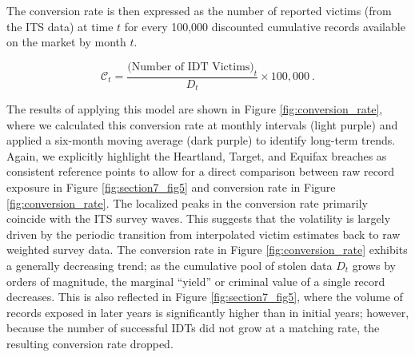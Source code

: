 The conversion rate is then expressed as the number of reported victims (from the ITS data) at time $t$ for every 100,000 discounted cumulative records available on the market by month $t$. 

\begin{equation}\mathcal{C}_t = \frac{\text{(Number of IDT Victims)}_t}{D_t} \times 100,000~. 
\end{equation}

The results of applying this model are shown in Figure \ref{fig:conversion_rate}, where we calculated this conversion rate at monthly intervals (light purple) and applied a six-month moving average (dark purple) to identify long-term trends. Again, we explicitly highlight the Heartland, Target, and Equifax breaches as consistent reference points to allow for a direct comparison between raw record exposure in Figure \ref{fig:section7_fig5} and conversion rate in Figure \ref{fig:conversion_rate}. The localized peaks in the conversion rate primarily coincide with the ITS survey waves. This suggests that the volatility is largely driven by the periodic transition from interpolated victim estimates back to raw weighted survey data.
The conversion rate in Figure \ref{fig:conversion_rate} exhibits a generally decreasing trend; as the cumulative pool of stolen data $D_t$ grows by orders of magnitude, the marginal ``yield'' or criminal value of a single record decreases. This is also reflected in Figure \ref{fig:section7_fig5}, where the volume of records exposed in later years is significantly higher than in initial years; however, because the number of successful IDTs did not grow at a matching rate, the resulting conversion rate dropped.




